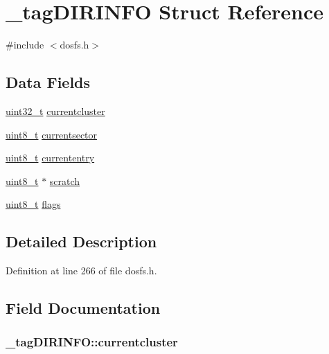 \hypertarget{struct__tag_d_i_r_i_n_f_o}{\section{\-\_\-tag\-D\-I\-R\-I\-N\-F\-O Struct Reference}
\label{struct__tag_d_i_r_i_n_f_o}
}


{\ttfamily \#include $<$dosfs.\-h$>$}

\subsection*{Data Fields}
\begin{DoxyCompactItemize}
\item 
\hyperlink{stdint_8h_a435d1572bf3f880d55459d9805097f62}{uint32\-\_\-t} \hyperlink{struct__tag_d_i_r_i_n_f_o_a9293dde8f8eaf8562ac9c6d9fd9775ab}{currentcluster}
\item 
\hyperlink{stdint_8h_aba7bc1797add20fe3efdf37ced1182c5}{uint8\-\_\-t} \hyperlink{struct__tag_d_i_r_i_n_f_o_afa2cf25d369bacfb663c66d155b94dc6}{currentsector}
\item 
\hyperlink{stdint_8h_aba7bc1797add20fe3efdf37ced1182c5}{uint8\-\_\-t} \hyperlink{struct__tag_d_i_r_i_n_f_o_aea457c15814fce786d57cb8c4a6d1c49}{currententry}
\item 
\hyperlink{stdint_8h_aba7bc1797add20fe3efdf37ced1182c5}{uint8\-\_\-t} $\ast$ \hyperlink{struct__tag_d_i_r_i_n_f_o_a49e322b7df078a285bd7eb2876a77d88}{scratch}
\item 
\hyperlink{stdint_8h_aba7bc1797add20fe3efdf37ced1182c5}{uint8\-\_\-t} \hyperlink{struct__tag_d_i_r_i_n_f_o_abb78f5191652783e44a4dfb207725fe1}{flags}
\end{DoxyCompactItemize}


\subsection{Detailed Description}


Definition at line 266 of file dosfs.\-h.



\subsection{Field Documentation}
\hypertarget{struct__tag_d_i_r_i_n_f_o_a9293dde8f8eaf8562ac9c6d9fd9775ab}{
\subsubsection[{currentcluster}]{ \-\_\-tag\-D\-I\-R\-I\-N\-F\-O\-::currentcluster}}\label{struct__tag_d_i_r_i_n_f_o_a9293dde8f8eaf8562ac9c6d9fd9775ab}


